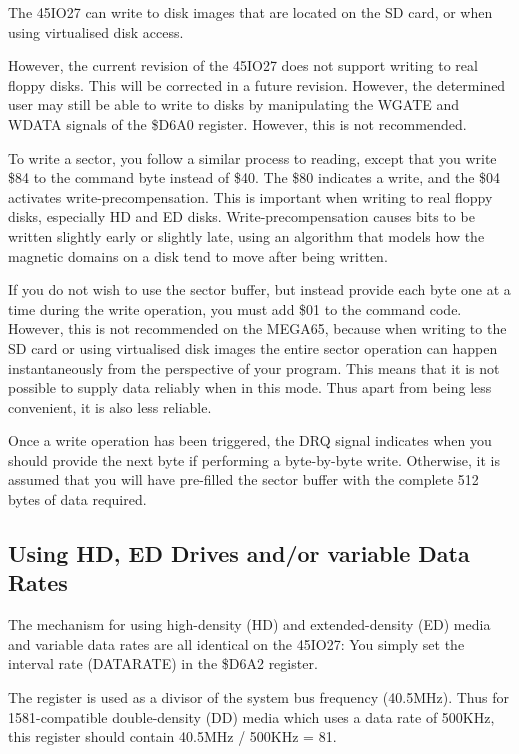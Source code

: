 The 45IO27 can write to disk images that are located on the SD card,
or when using virtualised disk access.

However, the current revision of the 45IO27 does not support writing to real
floppy disks.
This will be corrected in a future revision.  However, the determined
user may still be able to write to disks by manipulating the WGATE and
WDATA signals of the \$D6A0 register.  However, this is not
recommended.

To write a sector, you follow a similar process to reading, except
that you write \$84 to the command byte instead of \$40.  The \$80
indicates a write, and the \$04 activates write-precompensation.  This
is important when writing to real floppy disks, especially HD and ED
disks.  Write-precompensation causes bits to be written slightly early
or slightly late, using an algorithm that models how the magnetic
domains on a disk tend to move after being written.

If you do not wish
to use the sector buffer, but instead provide each byte one at a time
during the write operation, you must add \$01 to the command code.
However, this is not recommended on the MEGA65, because when writing
to the SD card or using virtualised disk images the entire sector
operation can happen instantaneously from the perspective of your
program.  This means that it is not possible to supply data reliably
when in this mode.  Thus apart from being less convenient, it is also
less reliable. 

Once a write operation has been triggered, the DRQ signal indicates
when you should provide the next byte if performing a byte-by-byte
write. Otherwise, it is assumed that you will have pre-filled the
sector buffer with the complete 512 bytes of data required.

\subsection{Using HD, ED Drives and/or variable Data Rates}

The mechanism for using high-density (HD) and extended-density (ED)
media and variable data rates are all identical on the 45IO27:  You
simply set the interval rate (DATARATE) in the \$D6A2 register.

The register is used as a divisor of the system bus frequency
(40.5MHz).  Thus for 1581-compatible double-density (DD) media which
uses a data rate of 500KHz, this register should contain 40.5MHz / 500KHz = 81.

